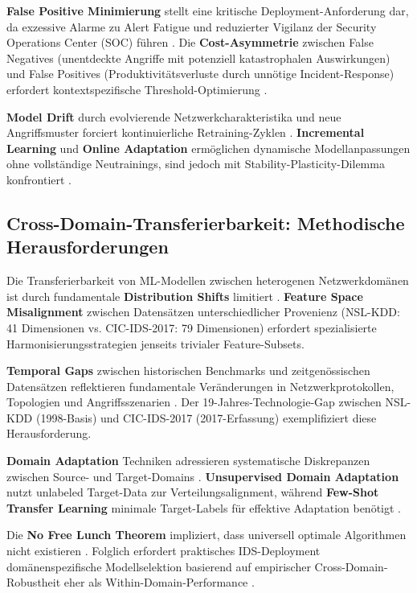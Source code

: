 \documentclass[11pt,a4paper]{article}
\begin{document}
    \textbf{False Positive Minimierung} stellt eine kritische Deployment-Anforderung dar, da exzessive Alarme zu Alert Fatigue und reduzierter Vigilanz der Security Operations Center (SOC) führen \parencite{Ring2019}. Die \textbf{Cost-Asymmetrie} zwischen False Negatives (unentdeckte Angriffe mit potenziell katastrophalen Auswirkungen) und False Positives (Produktivitätsverluste durch unnötige Incident-Response) erfordert kontextspezifische Threshold-Optimierung \parencite{Hastie2009}.

    \textbf{Model Drift} durch evolvierende Netzwerkcharakteristika und neue Angriffsmuster forciert kontinuierliche Retraining-Zyklen \parencite{Ring2019}. \textbf{Incremental Learning} und \textbf{Online Adaptation} ermöglichen dynamische Modellanpassungen ohne vollständige Neutrainings, sind jedoch mit Stability-Plasticity-Dilemma konfrontiert \parencite{Goodfellow2016}.

    \subsection{Cross-Domain-Transferierbarkeit: Methodische Herausforderungen}

    Die Transferierbarkeit von ML-Modellen zwischen heterogenen Netzwerkdomänen ist durch fundamentale \textbf{Distribution Shifts} limitiert \parencite{Bishop2006}. \textbf{Feature Space Misalignment} zwischen Datensätzen unterschiedlicher Provenienz (NSL-KDD: 41 Dimensionen vs. CIC-IDS-2017: 79 Dimensionen) erfordert spezialisierte Harmonisierungsstrategien jenseits trivialer Feature-Subsets.

    \textbf{Temporal Gaps} zwischen historischen Benchmarks und zeitgenössischen Datensätzen reflektieren fundamentale Veränderungen in Netzwerkprotokollen, Topologien und Angriffsszenarien \parencite{McHugh2000,Sharafaldin2018}. Der 19-Jahres-Technologie-Gap zwischen NSL-KDD (1998-Basis) und CIC-IDS-2017 (2017-Erfassung) exemplifiziert diese Herausforderung.

    \textbf{Domain Adaptation} Techniken adressieren systematische Diskrepanzen zwischen Source- und Target-Domains \parencite{Goodfellow2016}. \textbf{Unsupervised Domain Adaptation} nutzt unlabeled Target-Data zur Verteilungsalignment, während \textbf{Few-Shot Transfer Learning} minimale Target-Labels für effektive Adaptation benötigt \parencite{Hastie2009}.

    Die \textbf{No Free Lunch Theorem} impliziert, dass universell optimale Algorithmen nicht existieren \parencite{Bishop2006}. Folglich erfordert praktisches IDS-Deployment domänenspezifische Modellselektion basierend auf empirischer Cross-Domain-Robustheit eher als Within-Domain-Performance \parencite{Mourouzis2021}.
\end{document}

